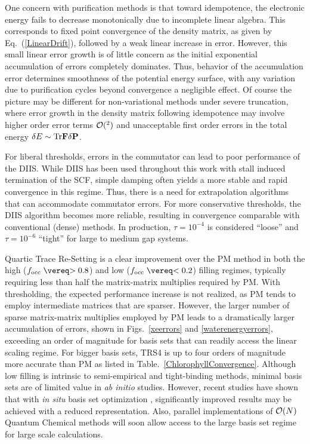 \commentoutA{\documentclass[prl,aps,twocolumn,showpacs,twocolumngrid,superbib]{revtex4}}
\begin{document}
One concern with purification methods is that toward idempotence, the electronic energy 
fails to decrease monotonically \cite{DBowler99,APalser99} due to incomplete linear algebra.  
This corresponds to fixed point convergence of the density matrix, as given 
by Eq.~(\ref{LinearDrift}), followed by a weak linear increase in error.  However, this small 
linear error growth is of little concern as the initial exponential accumulation of errors 
completely dominates.  Thus, behavior of the accumulation error determines smoothness of the
potential energy surface, with any variation due to purification cycles beyond convergence
a negligible effect.   Of course the picture may be different for non-variational methods under 
severe truncation, where error growth in the density matrix following idempotence may involve 
higher order error terms ${\cal O}(\bm \epsilon^2)$ and unacceptable first order errors in the 
total energy $\delta E \sim {\rm Tr} {\bf F} \delta \bf P$.

For liberal thresholds, errors in the commutator can lead to poor performance
of the DIIS.  While DIIS has been used throughout this work with stall induced termination of 
the SCF, simple damping often yields a more stable and rapid convergence in this regime.  Thus, 
there is a need for extrapolation algorithms that can accommodate commutator errors.  For more 
conservative thresholds, the DIIS algorithm becomes more reliable, resulting in convergence 
comparable with conventional (dense) methods.  In production, $\tau=10^{-4}$ is considered 
``loose'' and $\tau=10^{-6}$ ``tight'' for large to medium gap systems.  

Quartic Trace Re-Setting is a clear improvement over the PM method in both the high 
($f_{\rm occ}\gtrsim 0.8$) and low ($f_{\rm occ} \lesssim 0.2$) filling regimes,  typically requiring
less than half the matrix-matrix multiplies required by PM.  With thresholding, the expected performance 
increase is not realized, as PM tends to employ intermediate matrices that are sparser.  
However, the larger number of sparse matrix-matrix multiplies employed by PM leads to a dramatically larger 
accumulation of errors, shown in Figs.~\ref{xeerrors} and \ref{waterenergyerrors}, exceeding an order of 
magnitude for basis sets that can readily access the linear scaling regime.
For bigger basis sets,  TRS4 is up to four orders of magnitude more accurate than PM as listed in 
Table.~\ref{ChlorophyllConvergence}.  Although low filling is intrinsic to semi-empirical and tight-binding methods, 
minimal basis sets are of limited value in {\em ab initio} studies.  However, recent studies have shown that with 
{\em in situ} basis set optimization \cite{GBerghold02,EHernandez95,MLee97,JTalman01}, significantly improved results may 
be achieved with a reduced representation.  Also, parallel implementations of ${\cal O}(N)$ Quantum Chemical
methods \cite{MChallacombe99,CGan03} will soon allow access to the large basis set regime for large scale calculations.
\end{document}
